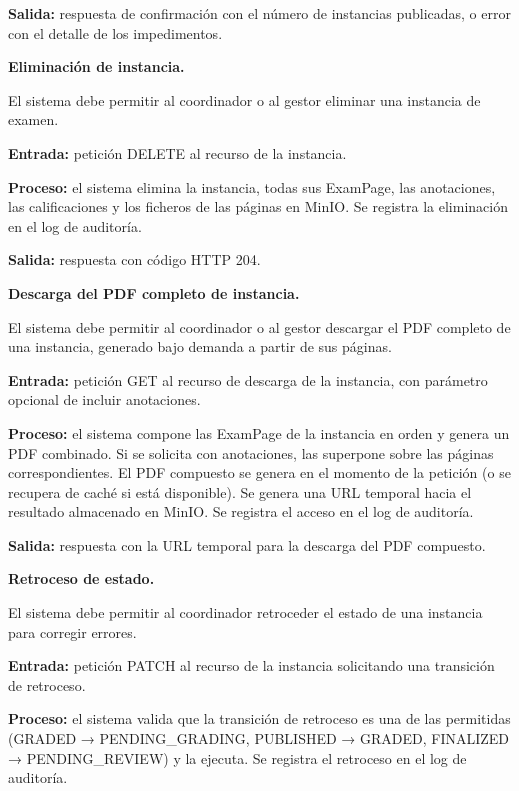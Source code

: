 \begin{functional}
\begin{functional}
    \textbf{Salida:} respuesta de confirmación con el número de instancias publicadas, o error con el detalle de los impedimentos.

    \item \textbf{Eliminación de instancia.}

    El sistema debe permitir al coordinador o al gestor eliminar una instancia de examen.

    \textbf{Entrada:} petición DELETE al recurso de la instancia.

    \textbf{Proceso:} el sistema elimina la instancia, todas sus ExamPage, las anotaciones, las calificaciones y los ficheros de las páginas en MinIO. Se registra la eliminación en el log de auditoría.

    \textbf{Salida:} respuesta con código HTTP 204.

    \item \textbf{Descarga del PDF completo de instancia.}

    El sistema debe permitir al coordinador o al gestor descargar el PDF completo de una instancia, generado bajo demanda a partir de sus páginas.

    \textbf{Entrada:} petición GET al recurso de descarga de la instancia, con parámetro opcional de incluir anotaciones.

    \textbf{Proceso:} el sistema compone las ExamPage de la instancia en orden y genera un PDF combinado. Si se solicita con anotaciones, las superpone sobre las páginas correspondientes. El PDF compuesto se genera en el momento de la petición (o se recupera de caché si está disponible). Se genera una URL temporal hacia el resultado almacenado en MinIO. Se registra el acceso en el log de auditoría.

    \textbf{Salida:} respuesta con la URL temporal para la descarga del PDF compuesto.

    \item \textbf{Retroceso de estado.}

    El sistema debe permitir al coordinador retroceder el estado de una instancia para corregir errores.

    \textbf{Entrada:} petición PATCH al recurso de la instancia solicitando una transición de retroceso.

    \textbf{Proceso:} el sistema valida que la transición de retroceso es una de las permitidas (GRADED → PENDING\_GRADING, PUBLISHED → GRADED, FINALIZED → PENDING\_REVIEW) y la ejecuta. Se registra el retroceso en el log de auditoría.


\end{functional}
\end{functional}
